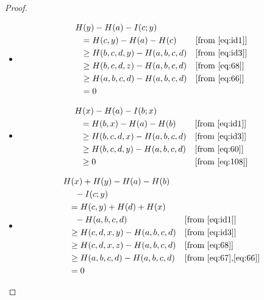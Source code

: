 \documentclass[10pt,journal]{IEEEtran}
\begin{document}
%
\begin{proof} \ \\
%
\begin{itemize}

\item [(i)]
\begin{align}
& H(y) - H(a) - I(c;y)\notag\\
&\ \ = H(c,y) - H(a) - H(c)                    & & [\mbox{from \eqref{eq:id1}}] \notag\\
&\ \ \ge H(b,c,d,y) - H(a,b,c,d)               & & [\mbox{from \eqref{eq:id3}}] \notag\\
&\ \ \ge H(b,c,d,z) - H(a,b,c,d)               & & [\mbox{from \eqref{eq:68}}] \notag\\
&\ \ \ge H(a,b,c,d) - H(a,b,c,d)               & & [\mbox{from \eqref{eq:66}}] \notag\\
&\ \ = 0                                       \label{eq:108}
\end{align}

\item [(ii)]
\begin{align*}
& H(x) - H(a) - I(b;x)\notag\\
&\ \ = H(b,x) - H(a) - H(b)                    & & [\mbox{from \eqref{eq:id1}}] \notag\\
&\ \ \ge H(b,c,d,x) - H(a,b,c,d)               & & [\mbox{from \eqref{eq:id3}}] \notag\\
&\ \ \ge H(b,c,d,y) - H(a,b,c,d)               & & [\mbox{from \eqref{eq:60}}] \notag\\
&\ \ \ge 0                                     & & [\mbox{from \eqref{eq:108}}] \notag
\end{align*}

\item [(iii)]
\begin{align*}
& H(x) + H(y) - H(a) - H(b)\notag\\
&\ \ \ \  - I(c;y)\notag\\
&\ \ = H(c,y) + H(d) + H(x)\notag\\
&\ \ \ \  - H(a,b,c,d)                        & & [\mbox{from \eqref{eq:id1}}] \notag\\
&\ \ \ge H(c,d,x,y) - H(a,b,c,d)              & & [\mbox{from \eqref{eq:id3}}] \notag\\
&\ \ \ge H(c,d,x,z) - H(a,b,c,d)              & & [\mbox{from \eqref{eq:68}}] \notag\\
&\ \ \ge H(a,b,c,d) - H(a,b,c,d)              & & [\mbox{from \eqref{eq:67},\eqref{eq:66}}] \notag\\
&\ \ =  0                                     \notag
\end{align*}


\end{itemize}
\end{proof}
\end{document}
